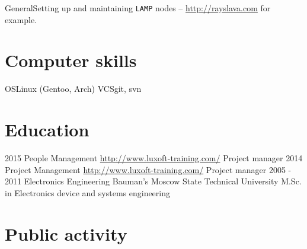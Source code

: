 \documentclass[11pt,a4paper]{moderncv}
\begin{document}
\cvitem
  {General}{Setting up and maintaining \texttt{LAMP} nodes -- \url{http://rayslava.com} for example.}

\section{Computer skills}
  \cvitem
  {OS}{Linux (Gentoo, Arch)}
  \cvitem
  {VCS}{git, svn}

\section{Education}
  \cventry
    {2015}
    {People Management}
    {\url{http://www.luxoft-training.com/}}
    {}{}
    {Project manager}
  \cventry
    {2014}
    {Project Management}
    {\url{http://www.luxoft-training.com/}}
    {}{}
    {Project manager}
  \cventry
    {2005 - 2011}
    {Electronics Engineering}
    {Bauman's Moscow State Technical University}
    {}{}
    {M.Sc. in Electronics device and systems engineering}

\section{Public activity}
\end{document}
